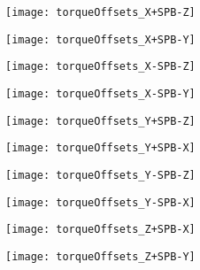 

\label{ch:offplot}

\texttt{[image: torqueOffsets\_X+SPB-Z]}

\texttt{[image: torqueOffsets\_X+SPB-Y]}


\texttt{[image: torqueOffsets\_X-SPB-Z]}

\texttt{[image: torqueOffsets\_X-SPB-Y]}


\texttt{[image: torqueOffsets\_Y+SPB-Z]}

\texttt{[image: torqueOffsets\_Y+SPB-X]}


\texttt{[image: torqueOffsets\_Y-SPB-Z]}

\texttt{[image: torqueOffsets\_Y-SPB-X]}


\texttt{[image: torqueOffsets\_Z+SPB-X]}

\texttt{[image: torqueOffsets\_Z+SPB-Y]}

